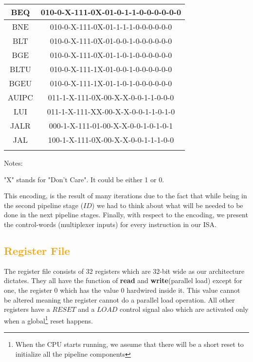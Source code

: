 \begin{center}
\begin{threeparttable}[!ht]
\begin{tabular}{|c|c|}
				BEQ &010-0-X-111-0X-01-0-1-1-0-0-0-0-0-0\\\hline
				BNE &010-0-X-111-0X-01-1-1-1-0-0-0-0-0-0\\\hline
				BLT &010-0-X-111-0X-01-0-0-1-0-0-0-0-0-0\\\hline
				BGE &010-0-X-111-0X-01-1-0-1-0-0-0-0-0-0\\\hline
				BLTU&010-0-X-111-1X-01-0-0-1-0-0-0-0-0-0\\\hline
				BGEU&010-0-X-111-1X-01-1-0-1-0-0-0-0-0-0\\\Xhline{5\arrayrulewidth}
				
				AUIPC&011-1-X-111-0X-00-X-X-0-0-1-1-0-0-0\\\hline
				LUI  &011-1-X-111-XX-00-X-X-0-0-1-1-0-1-0\\\hline
				JALR &000-1-X-111-01-00-X-X-0-0-1-0-1-0-1\\\hline
				JAL  &100-1-X-111-0X-00-X-X-0-0-1-1-1-0-0\\\Xhline{5\arrayrulewidth}
										
			\end{tabular}
				\begin{tablenotes}
				\footnotesize
				\item 
				Notes:
				\item 	
				"X" stands for "Don't Care". It could be either 1 or 0.
				\end{tablenotes}
				
				\label{subsec3.2:table3.2}
				\vspace{3mm}
		\end{threeparttable}
	
\end{center}

	This encoding, is the result of many iterations due to the fact that while being in the second pipeline stage ($ID$) we had to think about what will be needed to be done in the next pipeline stages. Finally, with respect to the encoding, we present the control-words (multiplexer inputs) for every instruction in our ISA.\\

\subsection{\textcolor{orange}{Register File}}

	The register file consists of $32$ registers which are $32$-bit wide as our architecture dictates. They all have the function of \textbf{read} and \textbf{write}(parallel load) except for one, the register $0$ which has the value $0$ hardwired inside it. This value cannot be altered meaning the register cannot do a parallel load operation. All other registers have a $RESET$ and a $LOAD$ control signal also which are activated only when a global\footnote{When the CPU starts running, we assume that there will be a short reset to initialize all the pipeline components} reset happens.\\
	
